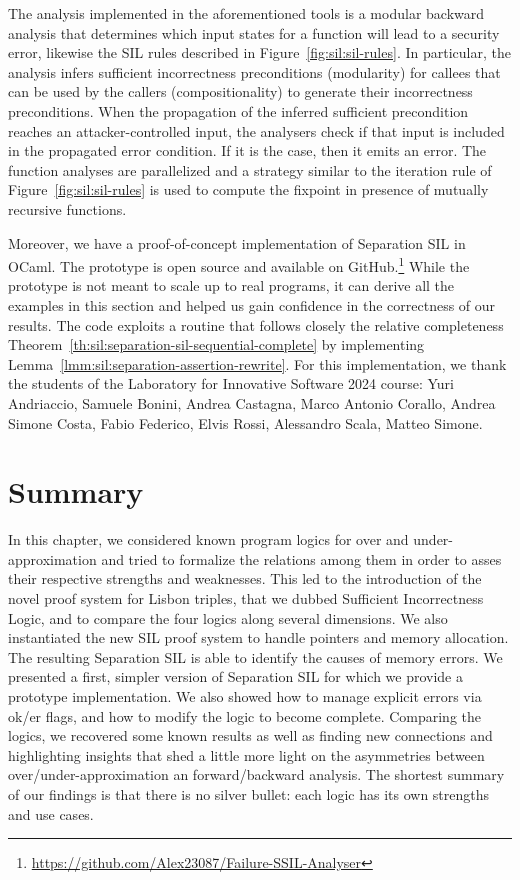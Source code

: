 The analysis implemented in the aforementioned tools is a modular backward analysis that determines which input states for a function will lead to a security error, likewise the SIL rules described in Figure~\ref{fig:sil:sil-rules}.
In particular, the analysis infers sufficient incorrectness preconditions (modularity) for callees that can be used by the callers (compositionality) to generate their incorrectness preconditions.
When the propagation of the inferred sufficient precondition reaches an attacker\hyp{}controlled input, the analysers check if that input is included in the propagated error condition.
If it is the case, then it emits an error.
The function analyses are parallelized and a strategy similar to the iteration rule of Figure~\ref{fig:sil:sil-rules} is used to compute the fixpoint in presence of mutually recursive functions.

Moreover, we have a proof-of-concept implementation of Separation SIL in OCaml. The prototype is open source and available on GitHub.\footnote{\url{https://github.com/Alex23087/Failure-SSIL-Analyser}} While the prototype is not meant to scale up to real programs, it can derive all the examples in this section and helped us gain confidence in the correctness of our results. The code exploits a routine that follows closely the relative completeness Theorem~\ref{th:sil:separation-sil-sequential-complete} by implementing Lemma~\ref{lmm:sil:separation-assertion-rewrite}.
For this implementation, we thank the students of the Laboratory for Innovative Software 2024 course: Yuri Andriaccio, Samuele Bonini, Andrea Castagna, Marco Antonio Corallo, Andrea Simone Costa, Fabio Federico, Elvis Rossi, Alessandro Scala, Matteo Simone.

\section{Summary}
In this chapter, we considered known program logics for over and under-approximation and tried to formalize the relations among them in order to asses their respective strengths and weaknesses. This led to the introduction of the novel proof system for Lisbon triples, that we dubbed Sufficient Incorrectness Logic, and to compare the four logics along several dimensions.
We also instantiated the new SIL proof system to handle pointers and memory allocation. The resulting Separation SIL is able to identify the causes of memory errors. We presented a first, simpler version of Separation SIL for which we provide a prototype implementation. We also showed how to manage explicit errors via ok/er flags, and how to modify the logic to become complete.
Comparing the logics, we recovered some known results as well as finding new connections and highlighting insights that shed a little more light on the asymmetries between over/under-approximation an forward/backward analysis. The shortest summary of our findings is that there is no silver bullet: each logic has its own strengths and use cases.

